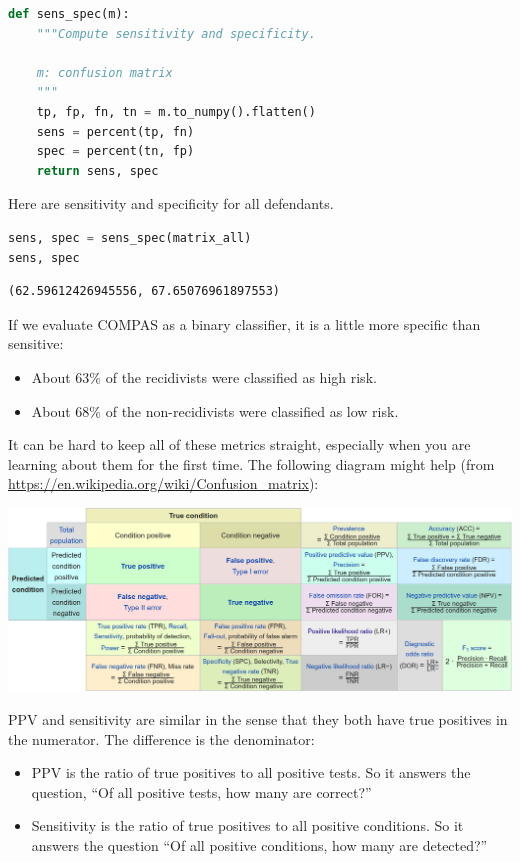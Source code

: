 \begin{lstlisting}[language=Python]
def sens_spec(m):
    """Compute sensitivity and specificity.
    
    m: confusion matrix
    """
    tp, fp, fn, tn = m.to_numpy().flatten()
    sens = percent(tp, fn)
    spec = percent(tn, fp)
    return sens, spec
\end{lstlisting}

Here are sensitivity and specificity for all defendants.

\begin{lstlisting}[language=Python]
sens, spec = sens_spec(matrix_all)
sens, spec
\end{lstlisting}

\begin{lstlisting}[]
(62.59612426945556, 67.65076961897553)
\end{lstlisting}

If we evaluate COMPAS as a binary classifier, it is a little more
specific than sensitive:

\begin{itemize}
\item
  About 63\% of the recidivists were classified as high risk.
\item
  About 68\% of the non-recidivists were classified as low risk.
\end{itemize}

It can be hard to keep all of these metrics straight, especially when
you are learning about them for the first time. The following diagram
might help (from \url{https://en.wikipedia.org/wiki/Confusion_matrix}):

\includegraphics{figs/confusion_matrix2.png}

PPV and sensitivity are similar in the sense that they both have true
positives in the numerator. The difference is the denominator:

\begin{itemize}
\item
  PPV is the ratio of true positives to all positive tests. So it
  answers the question, ``Of all positive tests, how many are correct?''
\item
  Sensitivity is the ratio of true positives to all positive conditions.
  So it answers the question ``Of all positive conditions, how many are
  detected?''
\end{itemize}


